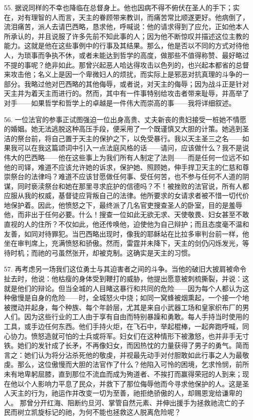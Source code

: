 55. 据说同样的不幸也降临在总督身上。他也因病不得不俯伏在圣人的手下；实在，对有理智的人而言，天主的眷顾带来教训，而痛苦常比顺遂更好。他病倒了，流泪痛苦，派人去请巴西略，恳求他，呼喊说：他的请求得到了应允，正如他本人所承认的，并且说服了许多先前不知此事的人；因为他不断惊叹并描述这位主教的能力。这就是他在这些事例中的行事及其结果。那么，他是否以不同的方式对待他人，为琐事而争执不休，或者未能达到哲学的高度，做那些不值得称赞、最好略过不提的事呢？绝非如此。那曾兴起恶人哈达得攻击以色列的，也兴起本都省的总督来攻击他；名义上是因一个卑微妇人的烦扰，而实际上是邪恶对抗真理的斗争的一部分。我略过他对巴西略的其他侮辱，或者说，对天主的侮辱；因为战斗正是针对天主并为着天主而进行的。然而，其中有一件事特别给攻击者带来耻辱，并高举了对手——如果哲学和哲学上的卓越是一件伟大而崇高的事——我将详细叙述。\par

56. 一位法官的参事正试图强迫一位出身高贵、丈夫新丧的贵妇接受一桩她不情愿的婚姻。她无法逃脱这种高压手段，便采用了一个既谨慎又大胆的计策。她逃到圣洁的祭台前，将自己置于天主的保护之下，以免受暴行。我以天主圣三之名——如果我可以在我这篇颂词中引入一点法庭风格的话——请问，应该做什么？我不是说伟大的巴西略——他在这些事上为我们所有人制定了法则——而是任何一位远不如他的司铎，难道不应该允许她的诉求，保护她、照顾她，伸手捍卫天主的仁慈和尊崇祭台的法律吗？难道不应该甘愿做任何事、受任何苦，也不参与任何不人道的阴谋，同时亵渎祭台和她在那里寻求庇护的信德吗？不！被挫败的法官说，所有人都应服从我的权威，基督徒应背叛自己的法律。他所要求的女请求者被不惜一切代价地保护着。因此，他愤怒之下，最终派了几名官吏搜查圣人的卧室，目的是羞辱他，而非出于任何必要。什么！搜查一位如此无欲无求、天使敬畏、妇女甚至不敢直视的人的住所？不仅如此，他还传唤他，迫使他为自己辩护；而且态度毫不温和友善，如同对待罪犯。当巴西略出现时，像我的耶稣站在比拉多审判台前一样，他坐在审判席上，充满愤怒和骄傲。然而，雷霆并未降下，天主的剑仍闪烁发光，等待时机；而祂的弓虽然张开，却被克制。这确实是天主的习惯。\par

57. 再考虑另一场我们这位勇士与其迫害者之间的斗争。当他的破旧大披肩被命令扯去时，他说：他枯瘦的身体受到鞭打的威胁，他提出愿意被刺梳撕裂，并说：这就是他们的辩论。但当全城的人目睹这暴行和共同的危险——因为每个人都认为这种傲慢是自身的危险——时，全城怒火中烧；如同一窝蜂被烟熏起，一个接一个地被搅动并起身，每个种族、每个年龄层，尤其是来自小武器工场和皇家织布厂的男人们。因为这些行业的工人由于享有自由而特别暴躁和勇敢。每人手持当时使用的工具，或手边任何东西。他们手持火炬，在飞石中，举起棍棒，一起奔跑呼喊，同心协力。愤怒造就可怕的士兵或将军。妇女们在这种情形下被激怒，也并非手无寸铁。她们的发针成了长矛，不再像妇女，而因热忱的力量获得了男子的勇气。简而言之：她们认为将分沾杀死他的敬虔，并视最先动手对付胆敢如此行事之人为最敬虔。那么，这位傲慢而大胆的法官作了什么？他陷入可怜的困境，乞求怜悯，前所未有地卑躬屈膝，直到那位不流血而成为殉道者、不挨打而赢得荣冠的人到来；现在他以个人影响力平息了民众，并救下了那位侮辱他而今寻求他保护的人。这是圣人天主的行为，祂运作并改变一切为至善，祂拒绝骄傲的人，却赐恩宠给谦卑的人。 那曾分开红海、阻断约旦河、掌管自然元素、并伸出援手为拯救祂流亡的子民而树立凯旋标记的祂，为何不能也拯救这人脱离危险呢？\par

